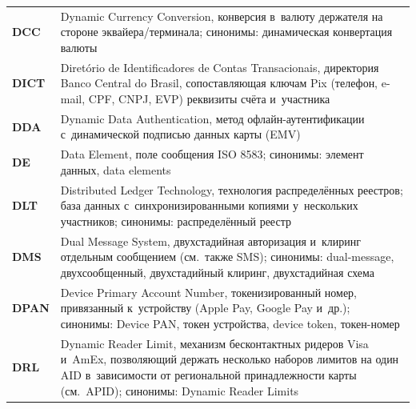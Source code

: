 \begin{longtable}{@{}p{4.5em}p{\dimexpr\linewidth-4.5em-2\tabcolsep\relax}@{}}
  \textbf{DCC}               & Dynamic Currency Conversion, конверсия в~валюту держателя на стороне эквайера/терминала; синонимы: динамическая конвертация валюты                                                                                                                                                               \\
  \textbf{DICT}              & Diretório de Identificadores de Contas Transacionais, директория Banco Central do Brasil, сопоставляющая ключам Pix (телефон, e-mail, CPF, CNPJ, EVP) реквизиты счёта и~участника                                                                                                                 \\
  \textbf{DDA}               & Dynamic Data Authentication, метод офлайн-аутентификации с~динамической подписью данных карты (EMV)                                                                                                                                                                                              \\
  \textbf{DE}                & Data Element, поле сообщения ISO 8583; синонимы: элемент данных, data elements                                                                                                                                                                                                                   \\
  \textbf{DLT}               & Distributed Ledger Technology, технология распределённых реестров; база данных с~синхронизированными копиями у~нескольких участников; синонимы: распределённый реестр                                                                                                                            \\
  \textbf{DMS}               & Dual Message System, двухстадийная авторизация и~клиринг отдельным сообщением (см.~также SMS); синонимы: dual-message, двухсообщенный, двухстадийный клиринг, двухстадийная схема                                                                                                                 \\
  \textbf{DPAN}              & Device Primary Account Number, токенизированный номер, привязанный к~устройству (Apple Pay, Google Pay и~др.); синонимы: Device PAN, токен устройства, device token, токен-номер                                                                                                                  \\
  \textbf{DRL}               & Dynamic Reader Limit, механизм бесконтактных ридеров Visa и~AmEx, позволяющий держать несколько наборов лимитов на один AID в~зависимости от региональной принадлежности карты (см.~APID); синонимы: Dynamic Reader Limits                                                                        \\

\end{longtable}
